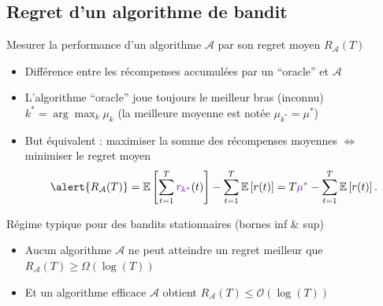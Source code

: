 \documentclass[11pt,french,ignorenonframetext,]{beamer}
\begin{document}


\subsection{\hfill{}Regret d'un algorithme de bandit\hfill{}}

\begin{frame}{Mesurer la performance d'un algorithme $\mathcal{A}$ par son regret moyen $R_{\mathcal{A}}(T)$}

\begin{itemize}
  \item
  Différence entre les récompenses accumulées par un ``oracle'' et $\mathcal{A}$

  \item
  L'algorithme ``oracle'' joue toujours \textcolor{deeppurple}{le meilleur bras (inconnu) $k^* = \arg\max_k \mu_k$} (la meilleure moyenne est notée \textcolor{deeppurple}{$\mu_{k^*} = \mu^*$})

  \item
  But équivalent : maximiser la somme des récompenses moyennes
  $\Longleftrightarrow$ \alert{minimiser le regret moyen}
  \[ \alert{ R_{\mathcal{A}}(T) } = \mathbb{E}\left[ \sum\limits_{t=1}^T \textcolor{deeppurple}{r_{k^*}}(t) \right] - \sum\limits_{t=1}^T \mathbb{E}\left[ r(t) \right] = T \textcolor{deeppurple}{\mu^*} - \sum\limits_{t=1}^T \mathbb{E}\left[ r(t) \right]. \]

\end{itemize}

\pause
\vspace*{10pt}

\begin{exampleblock}{Régime typique pour des bandits stationnaires (bornes inf \& sup)}
  \begin{itemize}
  \item
  Aucun algorithme $\mathcal{A}$ ne peut atteindre un regret meilleur que
  \hfill{}
  $R_{\mathcal{A}}(T) \geq \Omega(\log(T))$

  \item
  Et un algorithme efficace $\mathcal{A}$ obtient
  \hfill{}
  $R_{\mathcal{A}}(T) \leq \mathcal{O}(\log(T))$
  \end{itemize}
\end{exampleblock}

\end{frame}

\end{document}
